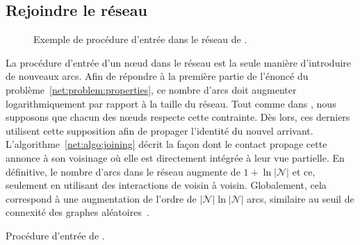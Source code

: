\subsection{Rejoindre le réseau}
\label{net:subsec:joining}

\begin{figure*}
  \centering
  \hspace{40pt}
  \hspace{10pt}
  \caption[Procédure d'entrée dans \SPRAY]
  {\label{net:fig:joiningexample} Exemple de procédure d'entrée dans
    le réseau de \SPRAY.}
\end{figure*}

La procédure d'entrée d'un nœud dans le réseau est la seule manière d'introduire
de nouveaux arcs. Afin de répondre à la première partie de l'énoncé du
problème~\ref{net:problem:properties}, ce nombre d'arcs doit augmenter
logarithmiquement par rapport à la taille du réseau. Tout comme dans \SCAMP, nous
supposons que chacun des nœuds respecte cette contrainte. Dès lors, ces derniers
utilisent cette supposition afin de propager l'identité du nouvel
arrivant. L'algorithme~\ref{net:algo:joining} décrit la façon dont le contact
propage cette annonce à son voisinage où elle est directement intégrée à leur
vue partielle. En définitive, le nombre d'arcs dans le réseau augmente de
$1 + \ln |\mathcal{N}|$ et ce, seulement en utilisant des interactions de voisin
à voisin. Globalement, cela correspond à une augmentation de l'ordre de
$|\mathcal{N}| \ln |\mathcal{N}|$ arcs, similaire au seuil de connexité des
graphes aléatoires~\cite{erdos1959random}.

\begin{algorithm}[h]
  
  \caption[Procédure d'entrée de \SPRAY] {\label{net:algo:joining}Procédure
    d'entrée de \SPRAY.}
\end{algorithm}

